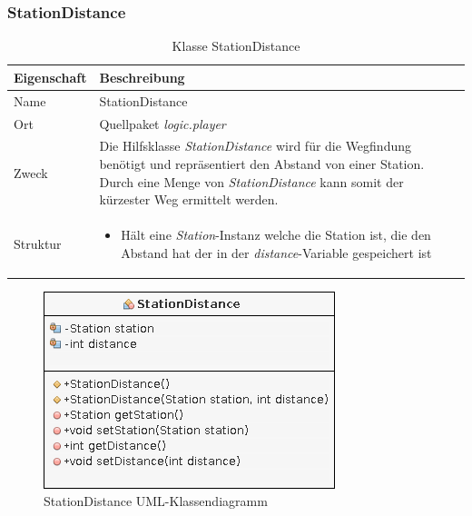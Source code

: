    \subsubsection{StationDistance}
        \begin{table}[H]
            \caption{Klasse StationDistance}
            \begin{tabular}{p{2.5cm}  p{9.5cm}} 
                \hline
                \textbf{Eigenschaft} & \textbf{Beschreibung}\\
                \hline
                Name & StationDistance\\
                Ort & Quellpaket \textit{logic.player}\\
                \hline
                Zweck &
                Die Hilfsklasse \textit{StationDistance} wird für die Wegfindung benötigt und repräsentiert
                den Abstand von einer Station.
                Durch eine Menge von \textit{StationDistance} kann somit der kürzester Weg ermittelt werden. 
                \\
                \hline
                Struktur &
                \begin{itemize}
                    \itemsep0em
                    \item Hält eine \textit{Station}-Instanz welche die Station ist, die den Abstand hat der in der \textit{distance}-Variable gespeichert ist
                \end{itemize}
                \\
                \hline
            \end{tabular}
        \end{table}
        \begin{figure}[H]
            \centering
            \includegraphics[scale=0.7]{img/uml/stationDistance.png}   
            \caption{StationDistance UML-Klassendiagramm}
        \end{figure}


